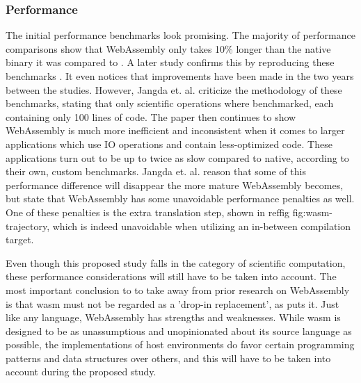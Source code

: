 \subsubsection*{Performance}

The initial performance benchmarks look promising. The majority of performance comparisons show that WebAssembly only takes 10\% longer than the native binary it was compared to \cite{haas_bringing_2017}. A later study confirms this by reproducing these benchmarks \cite{jangda_not_2019}. It even notices that improvements have been made in the two years between the studies. However, Jangda et. al. criticize the methodology of these benchmarks, stating that only scientific operations where benchmarked, each containing only 100 lines of code. The paper then continues to show WebAssembly is much more inefficient and inconsistent when it comes to larger applications which use IO operations and contain less-optimized code. These applications turn out to be up to twice as slow compared to native, according to their own, custom benchmarks. Jangda et. al. reason that some of this performance difference will disappear the more mature WebAssembly becomes, but state that WebAssembly has some unavoidable performance penalties as well. One of these penalties is the extra translation step, shown in reffig fig:wasm-trajectory, which is indeed unavoidable when utilizing an in-between compilation target. 

Even though this proposed study falls in the category of scientific computation, these performance considerations will still have to be taken into account. The most important conclusion to to take away from prior research on WebAssembly is that \ac{wasm} must not be regarded as a 'drop-in replacement', as \cite{melch_performance_2019} puts it. Just like any language, WebAssembly has strengths and weaknesses. While \ac{wasm} is designed to be as unassumptious and unopinionated about its source language as possible, the implementations of host environments do favor certain programming patterns and data structures over others, and this will have to be taken into account during the proposed study.



